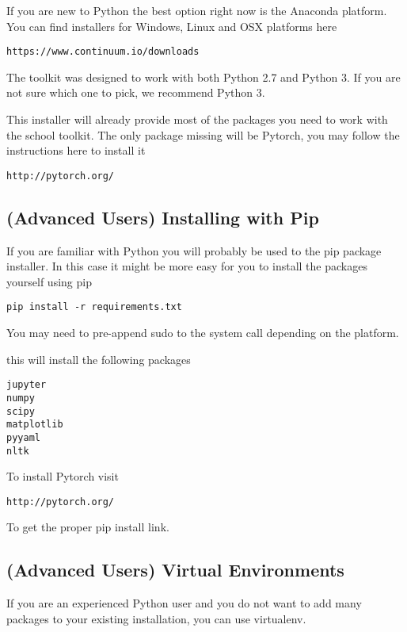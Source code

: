 If you are new to Python the best option right now is the Anaconda platform. You can find installers for Windows, Linux and OSX platforms here

\begin{verbatim}
https://www.continuum.io/downloads
\end{verbatim}

The toolkit was designed to work with both Python 2.7 and Python 3. If you are not sure which one to pick, we recommend Python 3.

This installer will already provide most of the packages you need to work with the school toolkit. The only package missing will be Pytorch, you may follow the instructions here to install it

\begin{verbatim}
http://pytorch.org/
\end{verbatim}

\subsection{(Advanced Users) Installing with Pip}

If you are familiar with Python you will probably be used to the pip package installer. In this case it might be more easy for you to install the packages yourself using pip

\begin{verbatim}
pip install -r requirements.txt 
\end{verbatim}

You may need to pre-append sudo to the system call depending on the platform.

\noindent this will install the following packages

\begin{verbatim}
jupyter
numpy
scipy
matplotlib
pyyaml
nltk
\end{verbatim}

\noindent To install Pytorch visit 

\begin{verbatim}
http://pytorch.org/
\end{verbatim}

\noindent To get the proper pip install link.

\subsection{(Advanced Users) Virtual Environments}

If you are an experienced Python user and you do not want to add many packages to your existing installation, you can use virtualenv.

